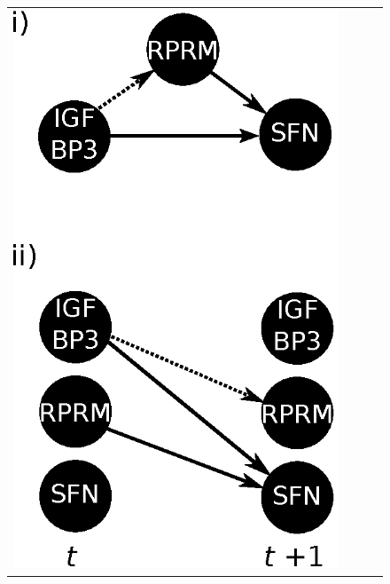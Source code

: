 \begin{figure}[t!]
\centering
\begin{tabular}{ccc}
\includegraphics[scale=0.63, angle=0]{motif_incoherentFFL.eps}
& \mbox{ } \qquad \mbox{ } &

\end{tabular}
\end{figure}
